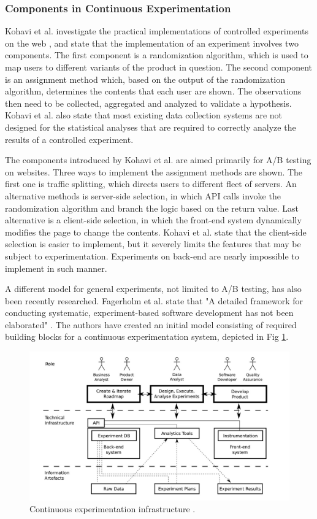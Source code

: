 \documentclass[english]{tktltiki2}
\theoremstyle{definition}
\theoremstyle{remark}
\begin{document}
\subsubsection{Components in Continuous Experimentation}
Kohavi et al. investigate the practical implementations of controlled experiments on the web \cite{kohavi2007practical}, and state that the implementation of an experiment involves two components. The first component is a randomization algorithm, which is used to map users to different variants of the product in question. The second component is an assignment method which, based on the output of the randomization algorithm, determines the contents that each user are shown. The observations then need to be collected, aggregated and analyzed to validate a hypothesis. Kohavi et al. also state that most existing data collection systems are not designed for the statistical analyses that are required to correctly analyze the results of a controlled experiment.

The components introduced by Kohavi et al. are aimed primarily for A/B testing on websites. Three ways to implement the assignment methods are shown. The first one is traffic splitting, which directs users to different fleet of servers. An alternative methods is server-side selection, in which API calls invoke the randomization algorithm and branch the logic based on the return value. Last alternative is a client-side selection, in which the front-end system dynamically modifies the page to change the contents. Kohavi et al. state that the client-side selection is easier to implement, but it severely limits the features that may be subject to experimentation. Experiments on back-end are nearly impossible to implement in such manner.

A different model for general experiments, not limited to A/B testing, has also been recently researched. Fagerholm et al. state that "A detailed framework for conducting systematic, experiment-based software development has not been elaborated" \cite{fagerholm2014building}. The authors have created an initial model consisting of required building blocks for a continuous experimentation system, depicted in Fig \ref{fig5}. 

\begin{figure}[h]
	\centering
	\includegraphics[width=5.0in]{infra.jpg}
	\caption{Continuous experimentation infrastructure \cite{fagerholm2014building}.}
	\label{fig5}
\end{figure}
\end{document}
